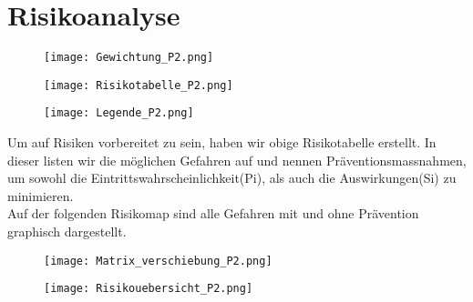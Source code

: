 \section{Risikoanalyse}
\begin{figure}[H]
	\centering
	\texttt{[image: Gewichtung\_P2.png]}
	\label{fig:Gewichtung}
\end{figure}

\newpage



\begin{figure}[H]
\centering
\texttt{[image: Risikotabelle\_P2.png]}
\label{fig:Risikotabell}
\end{figure}

\newpage
\begin{figure}[H]
	\centering
	\texttt{[image: Legende\_P2.png]}
	\label{fig:Tabelle}
\end{figure}
Um auf Risiken vorbereitet zu sein, haben wir obige Risikotabelle erstellt. In dieser listen wir die möglichen Gefahren auf und nennen Präventionsmassnahmen, um sowohl die Eintrittswahrscheinlichkeit(Pi), als auch die Auswirkungen(Si) zu minimieren.\\
Auf der folgenden Risikomap sind alle Gefahren mit und ohne Prävention graphisch dargestellt.

\begin{figure}[H]
	\centering
	\texttt{[image: Matrix\_verschiebung\_P2.png]}
	\label{fig:Matrix_verschiebung}
\end{figure}


\begin{figure}[H]
	\centering
	\texttt{[image: Risikouebersicht\_P2.png]}
	\label{fig:Risikoüebersicht}
\end{figure}
